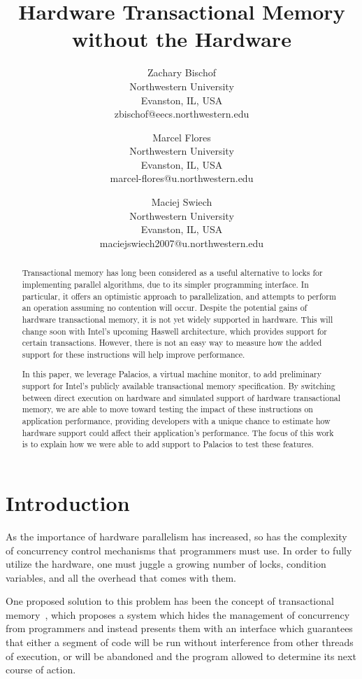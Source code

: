 \documentclass{acm_proc_article-sp}
\title{Hardware Transactional Memory without the Hardware}
\author{Zachary Bischof \\
	Northwestern University\\
	Evanston, IL, USA\\
	zbischof@eecs.northwestern.edu
	\and 
	Marcel Flores \\
	Northwestern University\\
	Evanston, IL, USA\\
	marcel-flores@u.northwestern.edu
	\and
	Maciej Swiech \\
	Northwestern University\\
	Evanston, IL, USA\\
	maciejswiech2007@u.northwestern.edu
    	\titlenote{Authors are listed in alphabetical order.}
        }
\begin{document}
\maketitle

\begin{abstract} 

Transactional memory has long been considered as a useful alternative to locks
for implementing parallel algorithms, due to its simpler programming interface.
In particular, it offers an optimistic approach to parallelization, and
attempts to perform an operation assuming no contention will occur. Despite the
potential gains of hardware transactional memory, it is not yet widely
supported in hardware. This will change soon with Intel's upcoming Haswell
architecture, which provides support for certain transactions. However, there
is not an easy way to measure how the added support for these instructions will
help improve performance.

In this paper, we leverage Palacios, a virtual machine monitor, to add
preliminary support for Intel's publicly available transactional memory
specification. By switching between direct execution on hardware and simulated
support of hardware transactional memory, we are able to move toward testing
the impact of these instructions on application performance, providing
developers with a unique chance to estimate how hardware support could affect
their application's performance. The focus of this work is to explain how we
were able to add support to Palacios to test these features.  

\end{abstract}

\section{Introduction} 

As the importance of hardware parallelism has increased, so has the complexity
of concurrency control mechanisms that programmers must use. In order to fully
utilize the hardware, one must juggle a growing number of locks, condition
variables, and all the overhead that comes with them.

One proposed solution to this problem has been the concept of transactional
memory~\cite{Herlihy:1993:TMA:173682.165164}, which proposes a system which
hides the management of concurrency from programmers and instead presents them
with an interface which guarantees that either a segment of code will be run
without interference from other threads of execution, or will be abandoned and
the program allowed to determine its next course of action.
\end{document}
